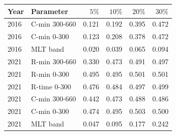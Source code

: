 \begin{tabular}{@{}llrrrr@{}}
\toprule
Year & Parameter & $5\%$ & $10\%$ & $20\%$ & $30\%$ \\
\midrule
2016 & C-min 300-660 & 0.121 & 0.192 & 0.395 & 0.472 \\
2016 & C-min 0-300 & 0.123 & 0.208 & 0.378 & 0.472 \\
2016 & MLT band & 0.020 & 0.039 & 0.065 & 0.094 \\
2021 & R-min 300-660 & 0.330 & 0.473 & 0.491 & 0.497 \\
2021 & R-min 0-300 & 0.495 & 0.495 & 0.501 & 0.501 \\
2021 & R-time 0-300 & 0.476 & 0.484 & 0.497 & 0.499 \\
2021 & C-min 300-660 & 0.442 & 0.473 & 0.488 & 0.486 \\
2021 & C-min 0-300 & 0.474 & 0.495 & 0.503 & 0.500 \\
2021 & MLT band & 0.047 & 0.095 & 0.177 & 0.242 \\
\bottomrule
\end{tabular}
